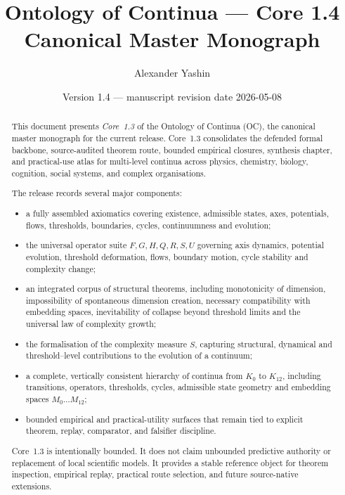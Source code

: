 
\title{Ontology of Continua --- Core 1.4 Canonical Master Monograph}
\author{Alexander Yashin}
\date{Version 1.4 --- manuscript revision date 2026-05-08}

\maketitle

\begin{abstract}
This document presents \emph{Core~1.3} of the Ontology of Continua (OC), the
canonical master monograph for the current release. Core~1.3 consolidates the
defended formal backbone, source-audited theorem route, bounded empirical
closures, synthesis chapter, and practical-use atlas for multi-level continua
across physics, chemistry, biology, cognition, social systems, and complex
organisations.

The release records several major components:
\begin{itemize}
    \item a fully assembled axiomatics covering existence, admissible states,
          axes, potentials, flows, thresholds, boundaries, cycles, continuumness
          and evolution;
    \item the universal operator suite \(F, G, H, Q, R, S, U\) governing axis
          dynamics, potential evolution, threshold deformation, flows, boundary
          motion, cycle stability and complexity change;
    \item an integrated corpus of structural theorems, including monotonicity
          of dimension, impossibility of spontaneous dimension creation,
          necessary compatibility with embedding spaces, inevitability of
          collapse beyond threshold limits and the universal law of complexity
          growth;
    \item the formalisation of the complexity measure \(S\), capturing structural,
          dynamical and threshold--level contributions to the evolution of a
          continuum;
    \item a complete, vertically consistent hierarchy of continua from \(K_0\)
          to \(K_{12}\), including transitions, operators, thresholds, cycles,
          admissible state geometry and embedding spaces \(M_0 \dots M_{12}\);
    \item bounded empirical and practical-utility surfaces that remain tied to
          explicit theorem, replay, comparator, and falsifier discipline.
\end{itemize}

Core~1.3 is intentionally bounded. It does not claim unbounded predictive authority
or replacement of local scientific models. It provides a stable reference
object for theorem inspection, empirical replay, practical route selection, and
future source-native extensions.
\end{abstract}

\tableofcontents
\clearpage
